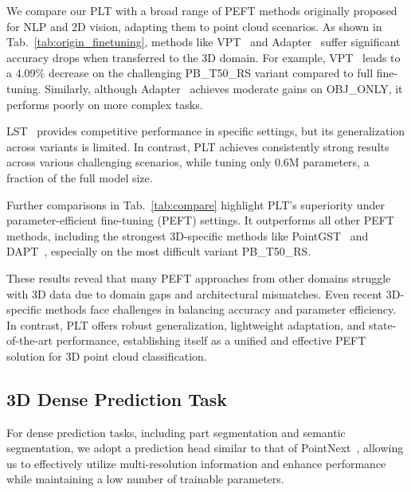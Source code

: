 We compare our PLT with a broad range of PEFT methods originally proposed for NLP and 2D vision, adapting them to point cloud scenarios. As shown in Tab.~\ref{tab:origin_finetuning}, methods like VPT~\cite{jia2022visual} and Adapter~\cite{houlsby2019parameter} suffer significant accuracy drops when transferred to the 3D domain. For example, VPT~\cite{jia2022visual} leads to a 4.09\% decrease on the challenging PB\_T50\_RS variant compared to full fine-tuning. Similarly, although Adapter~\cite{houlsby2019parameter} achieves moderate gains on OBJ\_ONLY, it performs poorly on more complex tasks.

LST~\cite{sung2022lst} provides competitive performance in specific settings, but its generalization across variants is limited. In contrast, PLT achieves consistently strong results across various challenging scenarios, while tuning only 0.6M parameters, a fraction of the full model size.

Further comparisons in Tab.~\ref{tab:compare} highlight PLT’s superiority under parameter-efficient fine-tuning (PEFT) settings. It outperforms all other PEFT methods, including the strongest 3D-specific methods like PointGST~\cite{liang2024parameter} and DAPT~\cite{zhou2024dynamic}, especially on the most difficult variant PB\_T50\_RS.

These results reveal that many PEFT approaches from other domains struggle with 3D data due to domain gaps and architectural mismatches. Even recent 3D-specific methods face challenges in balancing accuracy and parameter efficiency. In contrast, PLT offers robust generalization, lightweight adaptation, and state-of-the-art performance, establishing itself as a unified and effective PEFT solution for 3D point cloud classification. 





\subsection{3D Dense Prediction Task}
For dense prediction tasks, including part segmentation and semantic segmentation, we adopt a prediction head similar to that of PointNext~\cite{qian2022pointnext}, allowing us to effectively utilize multi-resolution information and enhance performance while maintaining a low number of trainable parameters.

